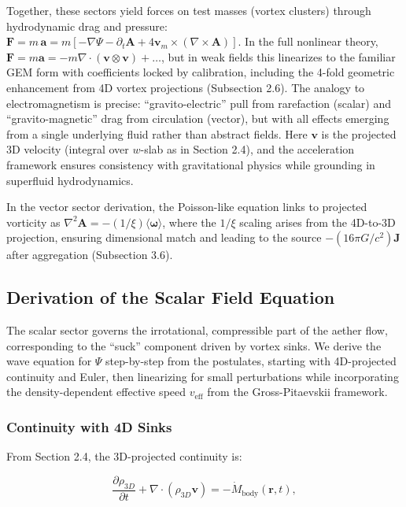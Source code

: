 \documentclass{article}
\begin{document}
Together, these sectors yield forces on test masses (vortex clusters) through hydrodynamic drag and pressure: $\mathbf{F} = m \, \mathbf{a} = m [ -\nabla \Psi - \partial_t \mathbf{A} + 4 \mathbf{v}_m \times (\nabla \times \mathbf{A}) ]$. In the full nonlinear theory, $\mathbf{F} = m \mathbf{a} = -m \nabla \cdot (\mathbf{v} \otimes \mathbf{v}) + \dots$, but in weak fields this linearizes to the familiar GEM form with coefficients locked by calibration, including the 4-fold geometric enhancement from 4D vortex projections (Subsection 2.6). The analogy to electromagnetism is precise: ``gravito-electric'' pull from rarefaction (scalar) and ``gravito-magnetic'' drag from circulation (vector), but with all effects emerging from a single underlying fluid rather than abstract fields. Here $\mathbf{v}$ is the projected 3D velocity (integral over $w$-slab as in Section 2.4), and the acceleration framework ensures consistency with gravitational physics while grounding in superfluid hydrodynamics.

In the vector sector derivation, the Poisson-like equation links to projected vorticity as $\nabla^2 \mathbf{A} = - (1/\xi) \langle \boldsymbol{\omega} \rangle$, where the $1/\xi$ scaling arises from the 4D-to-3D projection, ensuring dimensional match and leading to the source $-(16\pi G / c^2) \mathbf{J}$ after aggregation (Subsection 3.6).

\subsection{Derivation of the Scalar Field Equation}

The scalar sector governs the irrotational, compressible part of the aether flow, corresponding to the ``suck'' component driven by vortex sinks. We derive the wave equation for $\Psi$ step-by-step from the postulates, starting with 4D-projected continuity and Euler, then linearizing for small perturbations while incorporating the density-dependent effective speed $v_{\text{eff}}$ from the Gross-Pitaevskii framework.

\subsubsection{Continuity with 4D Sinks}

From Section 2.4, the 3D-projected continuity is:

\[
\frac{\partial \rho_{3D}}{\partial t} + \nabla \cdot (\rho_{3D} \mathbf{v}) = -\dot{M}_{\text{body}}(\mathbf{r}, t),
\]
\end{document}
